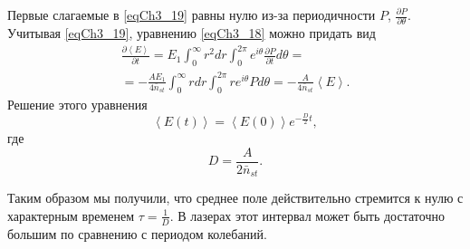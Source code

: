 Первые слагаемые в \eqref{eqCh3_19} равны нулю из-за периодичности $P$,
$\frac{\partial P}{\partial \theta}$.  Учитывая \eqref{eqCh3_19},
уравнению \eqref{eqCh3_18} можно придать вид 
\begin{eqnarray}
  \frac{\partial \left<E\right>}{\partial t} =
  E_1 \int_0^{\infty}r^2 dr \int_0^{2\pi}e^{i\theta}\frac{\partial
    P}{\partial t} d \theta
  =
  \nonumber \\
  = 
- \frac{A E_1}{4 \bar{n}_{st}}
\int_0^{\infty}r dr\int_0^{2 \pi}r e^{i \theta} P d \theta = 
- \frac{A}{4 \bar{n}_{st}} \left<E\right>.
\label{eqCh3_20}
\end{eqnarray}
Решение этого уравнения 
\begin{equation}
\left<E\left(t\right)\right> = 
\left<E\left(0\right)\right> e^{- \frac{D}{2}t},
\label{eqCh3_21}
\end{equation}
где 
\begin{equation}
D = \frac{A}{2 \bar{n}_{st}}.
\label{eqCh3_21a}
\end{equation}

Таким образом мы получили, что среднее поле действительно стремится к
нулю с характерным временем $\tau = \frac{1}{D}$.  В лазерах этот
интервал может быть достаточно большим по сравнению с периодом
колебаний.

